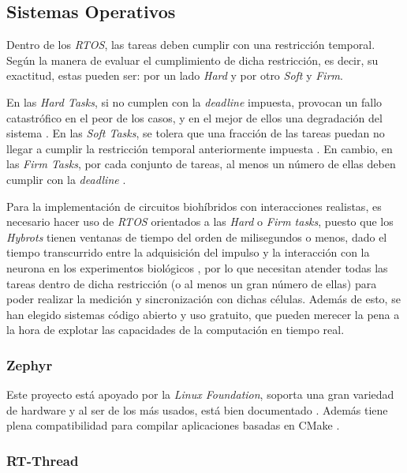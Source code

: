 \subsection{Sistemas Operativos\label{SS:SSOO}}


Dentro de los \textit{RTOS}, las tareas deben cumplir con una restricción temporal. Según la manera de evaluar el cumplimiento de dicha restricción, es decir, su exactitud, estas pueden ser: por un lado \textit{Hard} y por otro \textit{Soft} y \textit{Firm}.

En las \textit{Hard Tasks}, si no cumplen con la \textit{deadline} impuesta, provocan un fallo catastrófico en el peor de los casos, y en el mejor de ellos una degradación del sistema \cite{Lipari2015}. En las \textit{Soft Tasks}, se tolera que una fracción de las tareas puedan no llegar a cumplir la restricción temporal anteriormente impuesta \cite{Erickson2022}. En cambio, en las \textit{Firm Tasks}, por cada conjunto de tareas, al menos un número de ellas deben cumplir con la \textit{deadline} \cite{Behrouzian2020}.

Para la implementación de circuitos biohíbridos con interacciones realistas, es necesario hacer uso de \textit{RTOS} orientados a las \textit{Hard} o \textit{Firm tasks}, puesto que los \textit{Hybrots} tienen ventanas de tiempo del orden de milisegundos o menos, dado el tiempo transcurrido entre la adquisición del impulso y la interacción con la neurona en los experimentos biológicos \cite{Amaducci2019}, por lo que necesitan atender todas las tareas dentro de dicha restricción (o al menos un gran número de ellas) para poder realizar la medición y sincronización con dichas células. Además de esto, se han elegido sistemas código abierto y uso gratuito, que pueden merecer la pena a la hora de explotar las capacidades de la computación en tiempo real.


\subsubsection{Zephyr\label{SSS:ZEPHYR}}


Este proyecto está apoyado por la \textit{Linux Foundation}, soporta una gran variedad de hardware y al ser de los más usados, está bien documentado \cite{ZephyrTeam2024}. Además tiene plena compatibilidad para compilar aplicaciones basadas en CMake \cite{ZephyrTeam2025}.


\subsubsection{RT-Thread\label{SSS:RTTHREAD}}


